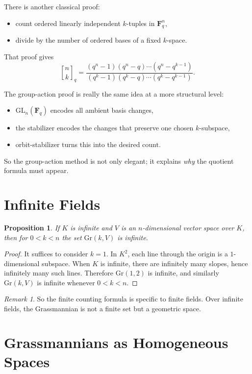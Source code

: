 \documentclass[11pt]{article}
\newtheorem{proposition}[theorem]{Proposition}
\theoremstyle{definition}
\theoremstyle{remark}
\newtheorem{remark}[theorem]{Remark}
\newcommand{\F}{\mathbf{F}}
\newcommand{\GL}{\mathrm{GL}}
\newcommand{\Gr}{\mathrm{Gr}}
\newcommand{\qbinom}[2]{\genfrac{[}{]}{0pt}{}{#1}{#2}_q}
\begin{document}
	There is another classical proof:
	\begin{itemize}
		\item count ordered linearly independent \(k\)-tuples in \(\F_q^n\),
		\item divide by the number of ordered bases of a fixed \(k\)-space.
	\end{itemize}
	
	That proof gives
	\[
	\qbinom{n}{k}
	=
	\frac{(q^n-1)(q^n-q)\cdots(q^n-q^{k-1})}
	{(q^k-1)(q^k-q)\cdots(q^k-q^{k-1})}.
	\]
	
	The group-action proof is really the same idea at a more structural level:
	\begin{itemize}
		\item \(\GL_n(\F_q)\) encodes all ambient basis changes,
		\item the stabilizer encodes the changes that preserve one chosen \(k\)-subspace,
		\item orbit-stabilizer turns this into the desired count.
	\end{itemize}
	
	So the group-action method is not only elegant; it explains \emph{why} the quotient formula must appear.
	
	\section{Infinite Fields}
	
	\begin{proposition}
		If \(K\) is infinite and \(V\) is an \(n\)-dimensional vector space over \(K\), then for \(0<k<n\) the set \(\Gr(k,V)\) is infinite.
	\end{proposition}
	
	\begin{proof}
		It suffices to consider \(k=1\). In \(K^2\), each line through the origin is a \(1\)-dimensional subspace. When \(K\) is infinite, there are infinitely many slopes, hence infinitely many such lines. Therefore \(\Gr(1,2)\) is infinite, and similarly \(\Gr(k,V)\) is infinite whenever \(0<k<n\).
	\end{proof}
	
	\begin{remark}
		So the finite counting formula is specific to finite fields. Over infinite fields, the Grassmannian is not a finite set but a geometric space.
	\end{remark}
	
	\section{Grassmannians as Homogeneous Spaces}
	
\end{document}
